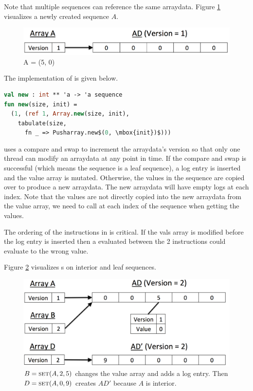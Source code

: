 Note that multiple sequences can reference the same arraydata. Figure \ref{fig:new_array_A} visualizes a newly created sequence $A$.

\begin{figure}[!ht]
\centering
\includegraphics[scale=0.3]{new_array_A}
\nocaptionrule \caption{A = \new{}(5, 0)}
\label{fig:new_array_A}
\end{figure}

The implementation of \new{} is given below.

\begin{lstlisting}[language=ML]
val new : int ** 'a -> 'a sequence
fun new(size, init) =
  (1, (ref 1, Array.new(size, init), 
    tabulate(size, 
      fn _ => Pusharray.new$(0, \mbox{init})$)))
\end{lstlisting}

\set{} uses a compare and swap to increment the arraydata's version so that only one thread can modify an arraydata at any point in time. If the compare and swap is successful (which means the sequence is a leaf sequence), a log entry is inserted and the value array is mutated. Otherwise, the values in the sequence are copied over to produce a new arraydata. The new arraydata will have empty logs at each index. Note that the values are not directly copied into the new arraydata from the value array, we need to call \get{} at each index of the sequence when getting the values. 

The ordering of the instructions in \set{} is critical. If the vals array is modified before the log entry is inserted then a \get{} evaluated between the 2 instructions could evaluate to the wrong value.

Figure \ref{fig:set_old_array} visualizes \set{}s on interior and leaf sequences.
\begin{figure}[!ht]
\centering
\includegraphics[scale=0.3]{set_old_array}
\nocaptionrule \caption{$B = \text{{\sc set}}(A, 2, 5)$ changes the value array and adds a log entry. Then $D = \text{{\sc set}}(A, 0, 9)$ creates $AD'$ because $A$ is interior.}
\label{fig:set_old_array}
\end{figure}

